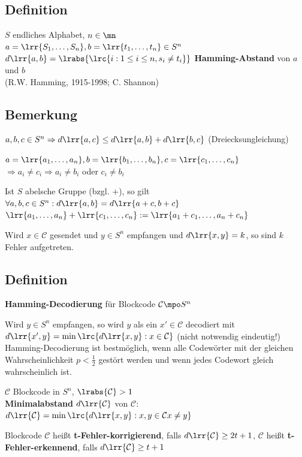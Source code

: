 	\subsection{Definition}
		$S$ endliches Alphabet, $n\in\mn$\\
		$a=\lrr{S_1,\dots,S_n}, b=\lrr{t_1,\dots,t_n}\in S^n$\\
		$d\lrr{a,b}=\lrabs{\lrc{i:1\leq i\leq n, s_i\neq t_i}}$ \textbf{Hamming-Abstand} von $a$ und $b$\\
		(R.W. Hamming, 1915-1998; C. Shannon)
		
	\subsection{Bemerkung}
			\item $a,b,c\in S^n \Rightarrow d\lrr{a,c}\leq d\lrr{a,b}+d\lrr{b,c}$ (Dreiecksungleichung)
			
				$a=\lrr{a_1,\dots,a_n}, b=\lrr{b_1,\dots,b_n}, c=\lrr{c_1,\dots,c_n}$\\
				$\Rightarrow a_i\neq c_i\Rightarrow a_i\neq b_i$ oder $c_i\neq b_i$
			\item Ist $S$ abelsche Gruppe (bzgl. $+$), so gilt\\
				$\forall a,b,c\in S^n: d\lrr{a,b}=d\lrr{a+c,b+c}$\\
				$\lrr{a_1,\dots,a_n}+\lrr{c_1,\dots,c_n}:=\lrr{a_1+c_1,\dots, a_n+c_n}$
			\item Wird $x\in\mathcal{C}$ gesendet und $y\in S^n$ empfangen und $d\lrr{x,y}=k$, so sind $k$ Fehler aufgetreten.
		\subExEnd
		
	\subsection{Definition}
			\item \textbf{Hamming-Decodierung} für Blockcode $\mathcal{C}\mpo S^n$
			
				Wird $y\in S^n$ empfangen, so wird $y$ als ein $x'\in\mathcal{C}$ decodiert mit\\
				$d\lrr{x',y}=\min\lrc{d\lrr{x,y}:x\in\mathcal{C}}$ (nicht notwendig eindeutig!)\\
				Hamming-Decodierung ist bestmöglich, wenn alle Codewörter mit der gleichen\\Wahrscheinlichkeit $p<\frac{1}{2}$ gestört werden und wenn jedes Codewort gleich wahrscheinlich ist.
			\item $\mathcal{C}$ Blockcode in $S^n$, $\lrabs{\mathcal{C}}>1$\\
				\textbf{Minimalabstand} $d\lrr{\mathcal{C}}$ von $\mathcal{C}$: $d\lrr{\mathcal{C}}=\min\lrc{d\lrr{x,y}:x,y\in\mathcal{C} x\neq y}$
			\item Blockcode $\mathcal{C}$ heißt \textbf{t-Fehler-korrigierend}, falls $d\lrr{\mathcal{C}}\geq 2t+1$, $\mathcal{C}$ heißt \textbf{t-Fehler-erkennend}, falls $d\lrr{\mathcal{C}}\geq t+1$
		\subExEnd
		
